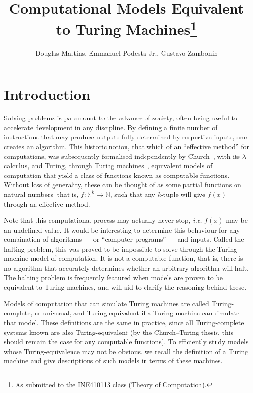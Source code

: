 \documentclass[12pt]{article}
\title{Computational Models Equivalent to Turing Machines\footnote{
    As submitted to the INE410113 class (Theory of Computation).}}
\author{Douglas Martins\inst{1}, Emmanuel Podestá Jr.\inst{1}, Gustavo Zambonin\inst{1}}
\begin{document}
 

\maketitle

\section{Introduction}\label{sec:intro}
 
Solving problems is paramount to the advance of society, often being useful to accelerate development in any discipline. By defining a finite number of instructions that may produce outputs fully determined by respective inputs, one creates an algorithm. This historic notion, that which of an ``effective method'' for computations, was subsequently formalised independently by Church~\cite{Church:article:1936:apr}, with its $\lambda$-calculus, and Turing, through Turing machines~\cite{Turing:article:1937:jan}, equivalent models of computation that yield a class of functions known as computable functions. Without loss of generality, these can be thought of as some partial functions on natural numbers, that is, $f : \mathbb{N}^{k} \rightarrow \mathbb{N}$, such that any $k$-tuple will give $f(x)$ through an effective method. 

Note that this computational process may actually never stop, \emph{i.e.} $f(x)$ may be an undefined value. It would be interesting to determine this behaviour for any combination of algorithms --- or ``computer programs'' --- and inputs. Called the halting problem, this was proved to be impossible to solve through the Turing machine model of computation. It is not a computable function, that is, there is no algorithm that accurately determines whether an arbitrary algorithm will halt. The halting problem is frequently featured when models are proven to be equivalent to Turing machines, and will aid to clarify the reasoning behind these.

Models of computation that can simulate Turing machines are called Turing-complete, or universal, and Turing-equivalent if a Turing machine can simulate that model. These definitions are the same in practice, since all Turing-complete systems known are also Turing-equivalent (by the Church--Turing thesis, this should remain the case for any computable functions). To efficiently study models whose Turing-equivalence may not be obvious, we recall the definition of a Turing machine and give descriptions of such models in terms of these machines.
\end{document}
